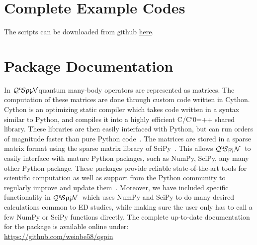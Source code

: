 \documentclass{SciPost}
\newcommand\0{\scalebox{-1}[1]{0}}
\let\svttfamily\ttfamily
\renewcommand\ttfamily{\svttfamily\catcode`0=\active }
\renewcommand\texttt{\bgroup\ttfamily\texttthelp}
\def\texttthelp#1{#1\egroup}
\newcommand{\qspin}{$\mathcal{Q}^{\mathrm{u}}\!\mathcal{S}\uprho\mathrm{\text{\textexclamdown}}\mathcal{N}$}
\begin{document}
\begin{appendix}
\newpage
\section{Complete Example Codes}
\label{app:scripts}

The scripts can be downloaded from github \href{https://github.com/weinbe58/qspin_paper/tree/master/scripts}{here}.


\newpage

\newpage

\newpage



\section{Package Documentation}
\label{app:doc}
In \qspin quantum many-body operators are represented as matrices. The computation of these matrices are done through custom code written in Cython. Cython is an optimizing static compiler which takes code written in a syntax similar to Python, and compiles it into a highly efficient C/C\texttt{++} shared library. These libraries are then easily interfaced with Python, but can run orders of magnitude faster than pure Python code~\cite{Cython}. The matrices are stored in a sparse matrix format using the sparse matrix library of SciPy~\cite{SciPy_package}. This allows \qspin\ to easily interface with mature Python packages, such as NumPy, SciPy, any many other Python package. These packages provide reliable state-of-the-art tools for scientific computation as well as support from the Python community to regularly improve and update them~\cite{NumPy,Python_computing_1,Python_computing_2,SciPy_package}. Moreover, we have included specific functionality in \qspin\ which uses NumPy and SciPy to do many desired calculations common to ED studies, while making sure the user only has to call a few NumPy or SciPy functions directly. The complete up-to-date documentation for the package is available online under:\\

\href{https://github.com/weinbe58/qspin}{https://github.com/weinbe58/qspin}\\

\end{appendix}
\end{document}
